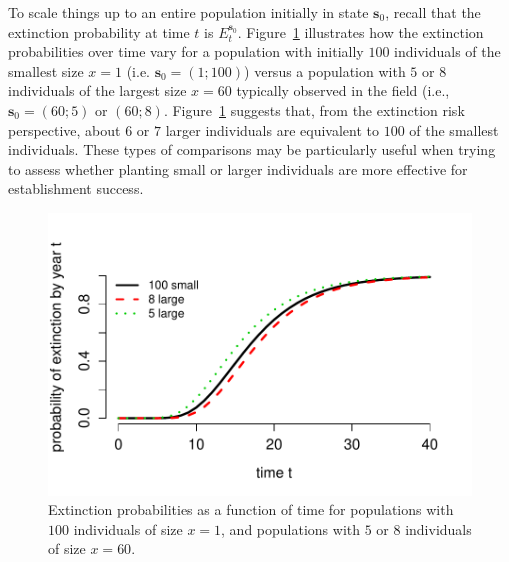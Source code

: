 \documentclass[12pt]{amsart}\usepackage[]{graphicx}\usepackage[]{color}
\makeatletter
\def\maxwidth{ %
  \ifdim\Gin@nat@width>\linewidth
    \linewidth
  \else
    \Gin@nat@width
  \fi
}
\newenvironment{knitrout}{}{} %
\def\s{\mathbf s}
\makeatother
\begin{document}
To scale things up to an entire population initially in state $\s_0$, recall that the extinction probability at time $t$ is $E_t^{\s_0}$. Figure~\ref{fig:compare} illustrates how the extinction probabilities over time vary for a population with initially $100$ individuals of the smallest size $x=1$ (i.e. $\s_0=(1;100)$) versus a population with $5$ or $8$ individuals of the largest size $x=60$ typically observed in the field (i.e., $\s_0=(60;5)$ or $(60;8)$. Figure~\ref{fig:compare} suggests that, from the extinction risk perspective, about $6$ or $7$ larger individuals are equivalent to $100$ of the smallest individuals. These types of comparisons may be particularly useful when trying to assess whether planting small or larger individuals are more effective for establishment success.

\begin{knitrout}
\color{fgcolor}\begin{figure}
\includegraphics[width=\maxwidth]{figure/compare-1} \caption[Extinction probabilities as a function of time for populations with ]{Extinction probabilities as a function of time for populations with $100$ individuals of size $x=1$, and populations with $5$ or $8$ individuals of size $x=60$.}\label{fig:compare}
\end{figure}


\end{knitrout}
\end{document}
